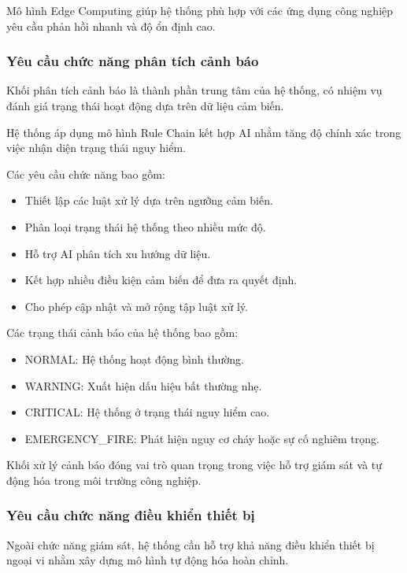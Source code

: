 Mô hình Edge Computing giúp hệ thống phù hợp với các ứng dụng công nghiệp yêu cầu phản hồi nhanh và độ ổn định cao.


\subsubsection{Yêu cầu chức năng phân tích cảnh báo}


Khối phân tích cảnh báo là thành phần trung tâm của hệ thống, có nhiệm vụ đánh giá trạng thái hoạt động dựa trên dữ liệu cảm biến.


Hệ thống áp dụng mô hình Rule Chain kết hợp AI nhằm tăng độ chính xác trong việc nhận diện trạng thái nguy hiểm.


Các yêu cầu chức năng bao gồm:


\begin{itemize}
    \item Thiết lập các luật xử lý dựa trên ngưỡng cảm biến.
    \item Phân loại trạng thái hệ thống theo nhiều mức độ.
    \item Hỗ trợ AI phân tích xu hướng dữ liệu.
    \item Kết hợp nhiều điều kiện cảm biến để đưa ra quyết định.
    \item Cho phép cập nhật và mở rộng tập luật xử lý.
\end{itemize}


Các trạng thái cảnh báo của hệ thống bao gồm:


\begin{itemize}
    \item NORMAL: Hệ thống hoạt động bình thường.
    \item WARNING: Xuất hiện dấu hiệu bất thường nhẹ.
    \item CRITICAL: Hệ thống ở trạng thái nguy hiểm cao.
    \item EMERGENCY\_FIRE: Phát hiện nguy cơ cháy hoặc sự cố nghiêm trọng.
\end{itemize}


Khối xử lý cảnh báo đóng vai trò quan trọng trong việc hỗ trợ giám sát và tự động hóa trong môi trường công nghiệp.


\subsubsection{Yêu cầu chức năng điều khiển thiết bị}


Ngoài chức năng giám sát, hệ thống cần hỗ trợ khả năng điều khiển thiết bị ngoại vi nhằm xây dựng mô hình tự động hóa hoàn chỉnh.


